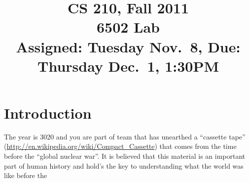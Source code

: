 \documentclass[11pt]{article}
\begin{document}
\title{CS 210, Fall 2011\\
6502 Lab \\
Assigned: Tuesday Nov.~8, Due: Thursday Dec.~1, 1:30PM}

\author{}
\date{}


\maketitle


\section{Introduction}

The year is 3020 and you are part of team that has unearthed a
``cassette tape''
(\url{http://en.wikipedia.org/wiki/Compact_Cassette}) that comes from
the time before the ``global nuclear war''.  It is believed that this
material is an important part of human history and hold's the key to
understanding what the world was like before the
\end{document}
